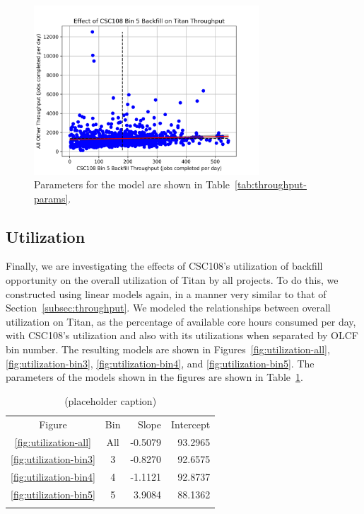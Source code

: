 \begin{figure}
  \includegraphics[width=0.75\textwidth]{images/linfit-throughput-bin5.png}
\caption{Parameters for the model are shown in
    Table~\ref{tab:throughput-params}.}
\label{fig:throughput-bin5}
\end{figure}


\subsection{Utilization}
\label{subsec:utilization}

Finally, we are investigating the effects of CSC108's utilization of backfill
opportunity on the overall utilization of Titan by all projects. To do this, we
constructed using linear models again, in a manner very similar to that of
Section~\ref{subsec:throughput}. We modeled the relationships between overall
utilization on Titan, as the percentage of available core hours consumed per
day, with CSC108's utilization and also with its utilizations when separated by
OLCF bin number. The resulting models are shown in
Figures~\ref{fig:utilization-all}, \ref{fig:utilization-bin3},
\ref{fig:utilization-bin4}, and \ref{fig:utilization-bin5}. The parameters of
the models shown in the figures are shown in
Table~\ref{tab:utilization-params}.

\begin{table}
\caption{(placeholder caption)}
\label{tab:utilization-params}       %
\begin{tabular}{ccrr}
\hline\noalign{\smallskip}
Figure  &   Bin & Slope   & Intercept   \\
\noalign{\smallskip}\hline\noalign{\smallskip}
\ref{fig:utilization-all}    &   All &  -0.5079 &   93.2965 \\
\ref{fig:utilization-bin3}   &   3   &  -0.8270 &   92.6575 \\
\ref{fig:utilization-bin4}   &   4   &  -1.1121 &   92.8737 \\
\ref{fig:utilization-bin5}   &   5   &  3.9084  &   88.1362 \\
\noalign{\smallskip}\hline
\end{tabular}
\end{table}

